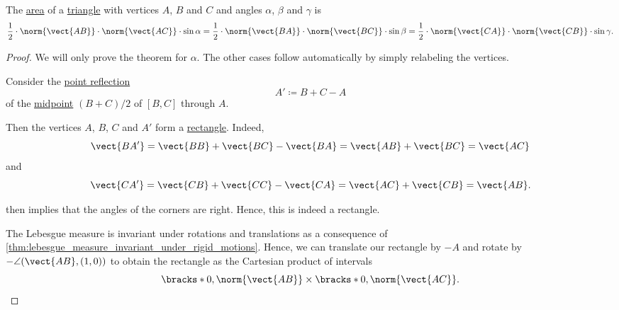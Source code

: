 \begin{proposition}\label{thm:area_of_triangle}
  The \hyperref[def:figure_area]{area} of a \hyperref[def:triangle]{triangle} with vertices \( A \), \( B \) and \( C \) and angles \( \alpha \), \( \beta \) and \( \gamma \) is
  \begin{equation}\label{eq:thm:area_of_triangle}
    \frac 1 2 \cdot \norm{\vect{AB}} \cdot \norm{\vect{AC}} \cdot \sin \alpha = \frac 1 2 \cdot \norm{\vect{BA}} \cdot \norm{\vect{BC}} \cdot \sin \beta = \frac 1 2 \cdot \norm{\vect{CA}} \cdot \norm{\vect{CB}} \cdot \sin \gamma.
  \end{equation}
\end{proposition}
\begin{proof}
  We will only prove the theorem for \( \alpha \). The other cases follow automatically by simply relabeling the vertices.

   Consider the \hyperref[def:rigid_motion/point_reflection]{point reflection}
  \begin{equation*}
    A' \coloneqq B + C - A
  \end{equation*}
  of the \hyperref[thm:segment_midpoint]{midpoint} \( (B + C) / 2 \) of \( [B, C] \) through \( A \).

  Then the vertices \( A \), \( B \), \( C \) and \( A' \) form a \hyperref[def:parallelogram/rectangle]{rectangle}. Indeed,
  \begin{equation*}
    \vect{BA'} = \vect{BB} + \vect{BC} - \vect{BA} = \vect{AB} + \vect{BC} = \vect{AC}
  \end{equation*}
  and
  \begin{equation*}
    \vect{CA'} = \vect{CB} + \vect{CC} - \vect{CA} = \vect{AC} + \vect{CB} = \vect{AB}.
  \end{equation*}

   then implies that the angles of the corners are right. Hence, this is indeed a rectangle.

  The Lebesgue measure is invariant under rotations and translations as a consequence of \cref{thm:lebesgue_measure_invariant_under_rigid_motions}. Hence, we can translate our rectangle by \( -A \) and rotate by \( -\angle(\vect{AB}, (1, 0)) \) to obtain the rectangle as the Cartesian product of intervals
  \begin{equation*}
    \bracks*{ 0, \norm{\vect{AB}} } \times \bracks*{ 0, \norm{\vect{AC}} }.
  \end{equation*}


\end{proof}
